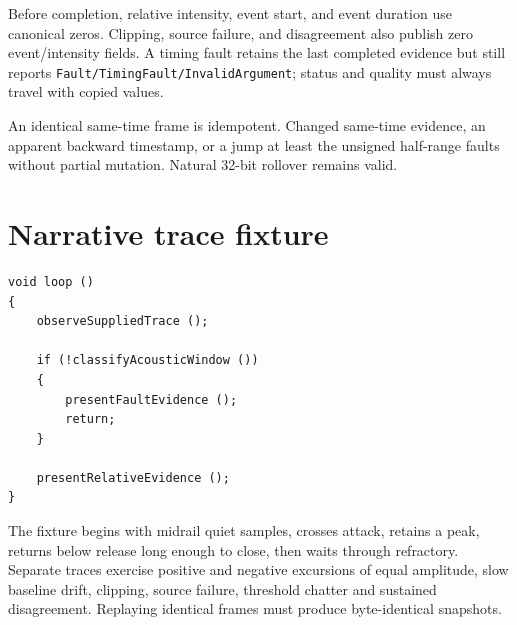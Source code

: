 \documentclass[11pt]{article}
\begin{document}
Before completion, relative intensity, event start, and event duration use
canonical zeros. Clipping, source failure, and disagreement also publish zero
event/intensity fields. A timing fault retains the last completed evidence but
still reports \texttt{Fault/TimingFault/InvalidArgument}; status and quality
must always travel with copied values.

An identical same-time frame is idempotent. Changed same-time evidence, an
apparent backward timestamp, or a jump at least the unsigned half-range faults
without partial mutation. Natural 32-bit rollover remains valid.

\clearpage
\section{Narrative trace fixture}
\begin{lstlisting}[style=adkcpp]
void loop ()
{
    observeSuppliedTrace ();

    if (!classifyAcousticWindow ())
    {
        presentFaultEvidence ();
        return;
    }

    presentRelativeEvidence ();
}
\end{lstlisting}
The fixture begins with midrail quiet samples, crosses attack, retains a peak,
returns below release long enough to close, then waits through refractory.
Separate traces exercise positive and negative excursions of equal amplitude,
slow baseline drift, clipping, source failure, threshold chatter and sustained
disagreement. Replaying identical frames must produce byte-identical snapshots.
\end{document}
